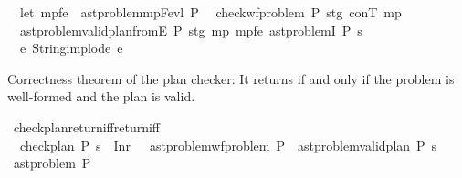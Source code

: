 \begin{isabellebody}
\ \ let\ mp{\isacharunderscore}{\kern0pt}fe\ {\isacharequal}{\kern0pt}\ ast{\isacharunderscore}{\kern0pt}problem{\isachardot}{\kern0pt}mp{\isacharunderscore}{\kern0pt}Fevl\ P{\isacharsemicolon}{\kern0pt}\isanewline
\ \ check{\isacharunderscore}{\kern0pt}wf{\isacharunderscore}{\kern0pt}problem\ P\ stg\ conT\ mp{\isacharsemicolon}{\kern0pt}\isanewline
\ \ ast{\isacharunderscore}{\kern0pt}problem{\isachardot}{\kern0pt}valid{\isacharunderscore}{\kern0pt}plan{\isacharunderscore}{\kern0pt}from{}E\ P\ stg\ mp\ mp{\isacharunderscore}{\kern0pt}fe\ {\isacharparenleft}{\kern0pt}ast{\isacharunderscore}{\kern0pt}problem{\isachardot}{\kern0pt}I\ P{\isacharparenright}{\kern0pt}\ {\isasympi}s\isanewline
{\isacharbraceright}{\kern0pt}\ {\isacharless}{\kern0pt}{\isacharplus}{\kern0pt}{\isacharquery}{\kern0pt}\ {\isacharparenleft}{\kern0pt}{\isasymlambda}e{\isachardot}{\kern0pt}\ String{\isachardot}{\kern0pt}implode\ {\isacharparenleft}{\kern0pt}e\ {\isacharparenleft}{\kern0pt}{\isacharparenright}{\kern0pt}\ {\isacharprime}{\kern0pt}{\isacharprime}{\kern0pt}{\isacharprime}{\kern0pt}{\isacharprime}{\kern0pt}{\isacharparenright}{\kern0pt}{\isacharparenright}{\kern0pt}{\isachardoublequoteclose}%
\begin{isamarkuptext}%
Correctness theorem of the plan checker: It returns 
  if and only if the problem is well-formed and the plan is valid.%
\end{isamarkuptext}\isamarkuptrue%
\isamarkupfalse%
\ check{\isacharunderscore}{\kern0pt}plan{\isacharunderscore}{\kern0pt}return{\isacharunderscore}{\kern0pt}iff{\isacharbrackleft}{\kern0pt}return{\isacharunderscore}{\kern0pt}iff{\isacharbrackright}{\kern0pt}{\isacharcolon}{\kern0pt}\ \isanewline
\ \ {\isachardoublequoteopen}check{\isacharunderscore}{\kern0pt}plan\ P\ {\isasympi}s\ {\isacharequal}{\kern0pt}\ Inr\ {\isacharparenleft}{\kern0pt}{\isacharparenright}{\kern0pt}\ {\isasymlongleftrightarrow}\ ast{\isacharunderscore}{\kern0pt}problem{\isachardot}{\kern0pt}wf{\isacharunderscore}{\kern0pt}problem\ P\ {\isasymand}\ ast{\isacharunderscore}{\kern0pt}problem{\isachardot}{\kern0pt}valid{\isacharunderscore}{\kern0pt}plan{}\ P\ {\isasympi}s{\isachardoublequoteclose}\isanewline
%
\isadelimproof
%
\endisadelimproof
%
\isatagproof
{}\isamarkupfalse%
\ {\isacharminus}{\kern0pt}\isanewline
\ \ \isamarkupfalse%
\ ast{\isacharunderscore}{\kern0pt}problem\ P\ \isakeywordONE{{\isachardot}{\kern0pt}}\isamarkupfalse%

\end{isabellebody}
